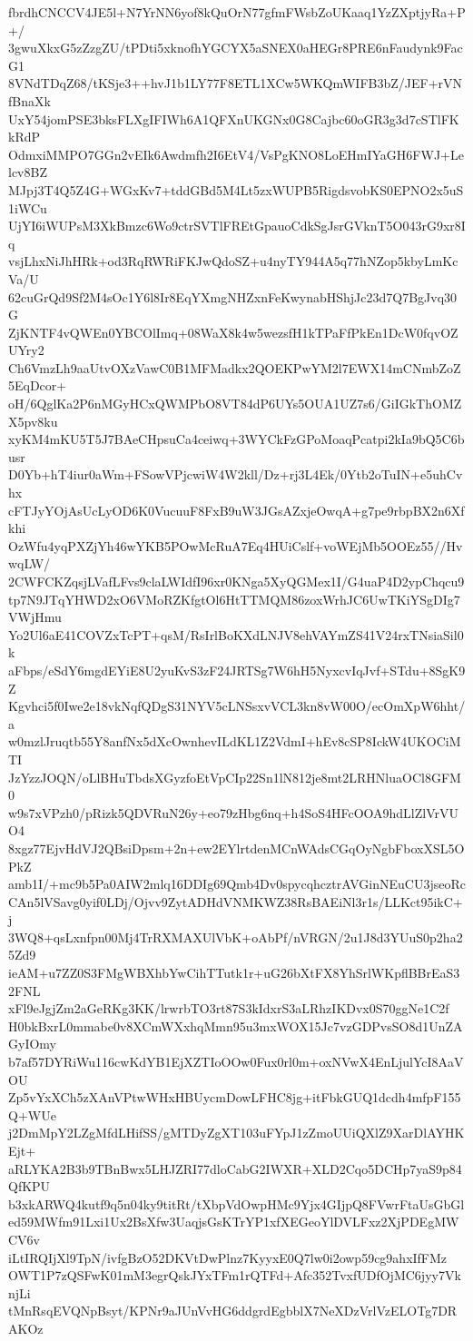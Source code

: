 fbrdhCNCCV4JE5l+N7YrNN6yof8kQuOrN77gfmFWsbZoUKaaq1YzZXptjyRa+P+/
3gwuXkxG5zZzgZU/tPDti5xknofhYGCYX5aSNEX0aHEGr8PRE6nFaudynk9FacG1
8VNdTDqZ68/tKSje3++hvJ1b1LY77F8ETL1XCw5WKQmWIFB3bZ/JEF+rVNfBnaXk
UxY54jomPSE3bksFLXgIFIWh6A1QFXnUKGNx0G8Cajbc60oGR3g3d7cSTlFKkRdP
OdmxiMMPO7GGn2vEIk6Awdmfh2I6EtV4/VsPgKNO8LoEHmIYaGH6FWJ+Lelcv8BZ
MJpj3T4Q5Z4G+WGxKv7+tddGBd5M4Lt5zxWUPB5RigdsvobKS0EPNO2x5uS1iWCu
UjYI6iWUPsM3XkBmzc6Wo9ctrSVTlFREtGpauoCdkSgJsrGVknT5O043rG9xr8Iq
vsjLhxNiJhHRk+od3RqRWRiFKJwQdoSZ+u4nyTY944A5q77hNZop5kbyLmKcVa/U
62cuGrQd9Sf2M4sOc1Y6l8Ir8EqYXmgNHZxnFeKwynabHShjJc23d7Q7BgJvq30G
ZjKNTF4vQWEn0YBCOlImq+08WaX8k4w5wezsfH1kTPaFfPkEn1DcW0fqvOZUYry2
Ch6VmzLh9aaUtvOXzVawC0B1MFMadkx2QOEKPwYM2l7EWX14mCNmbZoZ5EqDcor+
oH/6QglKa2P6nMGyHCxQWMPbO8VT84dP6UYs5OUA1UZ7s6/GiIGkThOMZX5pv8ku
xyKM4mKU5T5J7BAeCHpsuCa4ceiwq+3WYCkFzGPoMoaqPcatpi2kIa9bQ5C6busr
D0Yb+hT4iur0aWm+FSowVPjcwiW4W2kll/Dz+rj3L4Ek/0Ytb2oTuIN+e5uhCvhx
cFTJyYOjAsUcLyOD6K0VucuuF8FxB9uW3JGsAZxjeOwqA+g7pe9rbpBX2n6Xfkhi
OzWfu4yqPXZjYh46wYKB5POwMcRuA7Eq4HUiCslf+voWEjMb5OOEz55//HvwqLW/
2CWFCKZqsjLVafLFvs9claLWIdfI96xr0KNga5XyQGMex1I/G4uaP4D2ypChqcu9
tp7N9JTqYHWD2xO6VMoRZKfgtOl6HtTTMQM86zoxWrhJC6UwTKiYSgDIg7VWjHmu
Yo2Ul6aE41COVZxTcPT+qsM/RsIrlBoKXdLNJV8ehVAYmZS41V24rxTNsiaSil0k
aFbps/eSdY6mgdEYiE8U2yuKvS3zF24JRTSg7W6hH5NyxcvIqJvf+STdu+8SgK9Z
Kgvhci5f0Iwe2e18vkNqfQDgS31NYV5cLNSsxvVCL3kn8vW00O/ecOmXpW6hht/a
w0mzlJruqtb55Y8anfNx5dXcOwnhevILdKL1Z2VdmI+hEv8cSP8IckW4UKOCiMTI
JzYzzJOQN/oLlBHuTbdsXGyzfoEtVpCIp22Sn1lN812je8mt2LRHNluaOCl8GFM0
w9s7xVPzh0/pRizk5QDVRuN26y+eo79zHbg6nq+h4SoS4HFcOOA9hdLlZlVrVUO4
8xgz77EjvHdVJ2QBsiDpsm+2n+ew2EYlrtdenMCnWAdsCGqOyNgbFboxXSL5OPkZ
amb1I/+mc9b5Pa0AIW2mlq16DDIg69Qmb4Dv0spycqhcztrAVGinNEuCU3jseoRc
CAn5lVSavg0yif0LDj/Ojvv9ZytADHdVNMKWZ38RsBAEiNl3r1s/LLKct95ikC+j
3WQ8+qsLxnfpn00Mj4TrRXMAXUlVbK+oAbPf/nVRGN/2u1J8d3YUuS0p2ha25Zd9
ieAM+u7ZZ0S3FMgWBXhbYwCihTTutk1r+uG26bXtFX8YhSrlWKpflBBrEaS32FNL
xFl9eJgjZm2aGeRKg3KK/lrwrbTO3rt87S3kIdxrS3aLRhzIKDvx0S70ggNe1C2f
H0bkBxrL0mmabe0v8XCmWXxhqMmn95u3mxWOX15Jc7vzGDPvsSO8d1UnZAGyIOmy
b7af57DYRiWu116cwKdYB1EjXZTIoOOw0Fux0rl0m+oxNVwX4EnLjulYcI8AaVOU
Zp5vYxXCh5zXAnVPtwWHxHBUycmDowLFHC8jg+itFbkGUQ1dcdh4mfpF155Q+WUe
j2DmMpY2LZgMfdLHifSS/gMTDyZgXT103uFYpJ1zZmoUUiQXlZ9XarDlAYHKEjt+
aRLYKA2B3b9TBnBwx5LHJZRI77dloCabG2IWXR+XLD2Cqo5DCHp7yaS9p84QfKPU
b3xkARWQ4kutf9q5n04ky9titRt/tXbpVdOwpHMc9Yjx4GIjpQ8FVwrFtaUsGbGl
ed59MWfm91Lxi1Ux2BsXfw3UaqjsGsKTrYP1xfXEGeoYlDVLFxz2XjPDEgMWCV6v
iLtIRQIjXl9TpN/ivfgBzO52DKVtDwPlnz7KyyxE0Q7lw0i2owp59cg9ahxIfFMz
OWT1P7zQSFwK01mM3egrQskJYxTFm1rQTFd+Afc352TvxfUDfOjMC6jyy7VknjLi
tMnRsqEVQNpBsyt/KPNr9aJUnVvHG6ddgrdEgbblX7NeXDzVrlVzELOTg7DRAKOz

